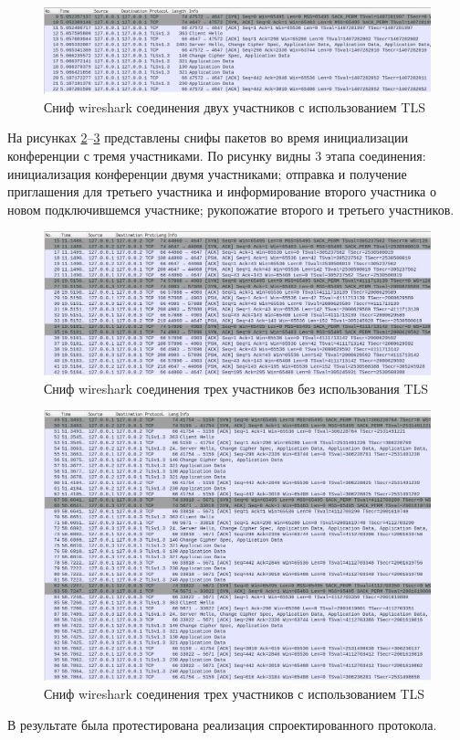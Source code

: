 \begin{figure}[H]
  \centering
  \includegraphics[width=\linewidth]{inc/img/trace-conf-2-tls.png}
  \caption{Сниф wireshark соединения двух участников с использованием TLS}
  \label{img:trace-conf-2-tls}
\end{figure}

На рисунках \ref{img:trace-conf-3}--\ref{img:trace-conf-3-tls} представлены снифы пакетов во время инициализации конференции с тремя участниками. По рисунку видны 3 этапа соединения: инициализация конференции двумя участниками; отправка и получение приглашения для третьего участника и информирование второго участника о новом подключившемся участнике; рукопожатие второго и третьего участников.

\begin{figure}[H]
  \centering
  \includegraphics[width=\linewidth]{inc/img/trace-conf-3.png}
  \caption{Сниф wireshark соединения трех участников без использования TLS}
  \label{img:trace-conf-3}
\end{figure}

\begin{figure}[H]
  \centering
  \includegraphics[width=\linewidth]{inc/img/trace-conf-3-tls.png}
  \caption{Сниф wireshark соединения трех участников с использованием TLS}
  \label{img:trace-conf-3-tls}
\end{figure}

В результате была протестирована реализация спроектированного протокола.
